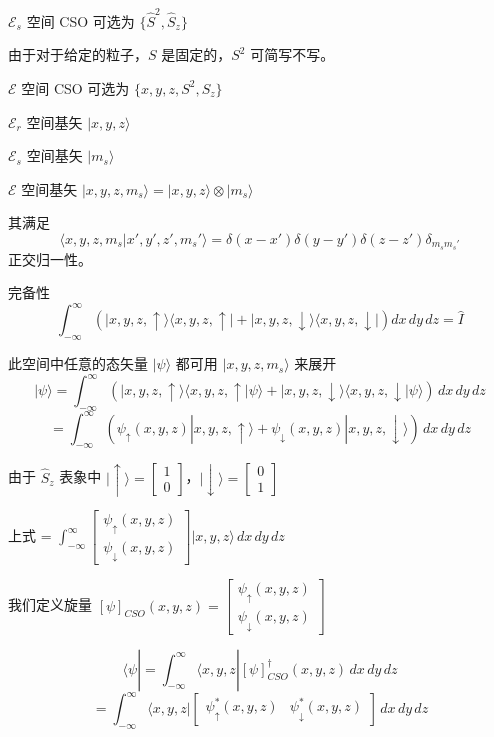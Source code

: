 \documentclass[lang=cn,10pt]{elegantbook}
\begin{document}
\begin{enumerate}
		$\mathcal{E}_s$ 空间 CSO 可选为 $\{\hat{S}^2, \hat{S}_z\}$
	
	由于对于给定的粒子，$S$ 是固定的，$S^2$ 可简写不写。
	
		$\mathcal{E}$ 空间 CSO 可选为 $\{x, y, z, S^2, S_z\}$
	
	$\mathcal{E}_r$ 空间基矢 $|x, y, z\rangle$
	
	$\mathcal{E}_s$ 空间基矢 $|m_s\rangle$
	
	$\mathcal{E}$ 空间基矢 $|x, y, z, m_s\rangle = |x, y, z\rangle \otimes |m_s\rangle$
	
	其满足
	\[
	\langle x, y, z, m_s | x', y', z', m_s' \rangle = \delta(x-x')\delta(y-y')\delta(z-z')\delta_{m_s m_s'}
	\]
	正交归一性。
	
	完备性
	\[
\int_{-\infty}^{\infty} \left( |x, y, z, \uparrow\rangle \langle x, y, z, \uparrow| + |x, y, z, \downarrow\rangle \langle x, y, z, \downarrow| \right) dx \, dy \, dz = \hat{I}
	\]
	
	此空间中任意的态矢量 $|\psi\rangle$ 都可用 $|x, y, z, m_s\rangle$ 来展开
	\[
	|\psi\rangle = \int_{-\infty}^{\infty} \left( |x, y, z, \uparrow\rangle \langle x, y, z, \uparrow | \psi \rangle + |x, y, z, \downarrow\rangle \langle x, y, z, \downarrow | \psi \rangle \right) \, dx \, dy \, dz
	\]
		\[
		= \int_{-\infty}^{\infty} \left( \psi_\uparrow(x, y, z) |x, y, z, \uparrow\rangle + \psi_\downarrow(x, y, z) |x, y, z, \downarrow\rangle \right) \, dx \, dy \, dz
		\]
		
		由于 $\hat{S}_z$ 表象中 $|\uparrow\rangle = \begin{bmatrix} 1 \\ 0 \end{bmatrix}$，$|\downarrow\rangle = \begin{bmatrix} 0 \\ 1 \end{bmatrix}$
	
	上式 = $\int_{-\infty}^{\infty} \begin{bmatrix} \psi_\uparrow(x, y, z) \\ \psi_\downarrow(x, y, z) \end{bmatrix} |x, y, z\rangle \, dx \, dy \, dz$
	
	我们定义旋量 $[\psi]_{CSO}(x, y, z) = \begin{bmatrix} \psi_\uparrow(x, y, z) \\ \psi_\downarrow(x, y, z) \end{bmatrix}$
	
	\[
	\langle \psi | = \int_{-\infty}^{\infty} \langle x, y, z | [\psi]_{CSO}^\dagger(x, y, z) \, dx \, dy \, dz
	\]
	\[
	= \int_{-\infty}^{\infty} \langle x, y, z | \begin{bmatrix} \psi_\uparrow^*(x, y, z) & \psi_\downarrow^*(x, y, z) \end{bmatrix} \, dx \, dy \, dz
	\]
	

\end{enumerate}
\end{document}
